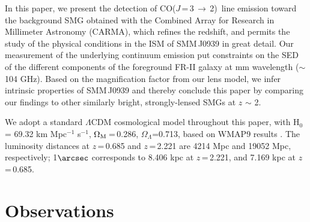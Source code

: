 \documentclass[twocolumn,apj,numberedappendix]{emulateapj}
\newcommand{\CO}{\mbox{CO($J$\,=\,3\,$\rightarrow$\,2) }}
\newcommand{\pmOne}{\mbox{$^{-1}$}}
\begin{document}
In this paper, we present the detection of \CO line emission toward the background SMG obtained with the Combined
Array for Research in Millimeter Astronomy (CARMA), which refines the redshift, and permits the study of the physical conditions in the ISM of SMM\,J0939 in great detail. Our measurement of the underlying continuum emission put constraints on the SED of the different components of the foreground FR-II galaxy at mm wavelength ($\sim$104 GHz). Based on the magnification factor from our lens model, we infer intrinsic properties of SMM\,J0939 and thereby 
conclude this paper by comparing our findings to other similarly bright, strongly-lensed SMGs at $z$\,\,$\sim$\,\,2.

We adopt a standard $\Lambda$CDM cosmological model throughout this paper, with H$_0$= 69.32 km\,\,Mpc\pmOne\,\,s\pmOne, $\Omega_{\rm M}$\,=\,0.286, $\Omega_\Lambda$=0.713, based on WMAP9 results \citep{Hinshaw13a}.
The luminosity distances at $z$\,=\,0.685 and $z$\,=\,2.221 are 4214 Mpc and 19052 Mpc, respectively; 1$\arcsec$
corresponds to 8.406 kpc at $z$\,=\,2.221, and 7.169 kpc at $z$\,=\,0.685.

\section{Observations}\label{sec:obs}
\end{document}
